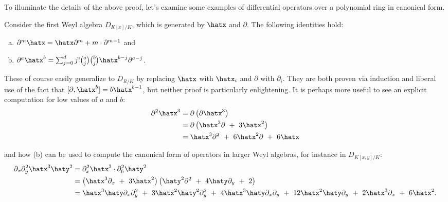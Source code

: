 To illuminate the details of the above proof, let's examine some examples of differential operators over a polynomial ring in canonical form.
\begin{example}\label{example:diff-op-canonical-form}
	Consider the first Weyl algebra $D_{K[x]/K}$, which is generated by $\hatx$ and $\partial$. The following identities hold:
	\begin{enumerate}[(a)]
		\item $\partial^m \hatx = \hatx\partial^m + m\cdot\partial^{m-1}$ and 
		\item $\partial^a\hatx^b = \sum^d_{j=0} j!\binom{a}{j}\binom{b}{j} \hatx^{b-j}\partial^{a-j}$.
	\end{enumerate}
	These of course easily generalize to $D_{R/K}$ by replacing $\hatx$ with $\hatx_i$ and $\partial$ with $\partial_i$. They are both proven via induction and liberal use of the fact that $[\partial,\hatx^b] = b\hatx^{b-1}$, but neither proof is particularly enlightening. It is perhaps more useful to see an explicit computation for low values of $a$ and $b$:
    \begin{align*}
    	\partial^2\hatx^3 
		&= \partial\left(\partial \hatx^3\right) \\
		&= \partial\left(\hatx^3\partial ~+~ 3\hatx^2\right) \\
		&= \hatx^3\partial^2 ~+~ 6\hatx^2\partial ~+~ 6\hatx
    \end{align*}

	\begin{comment}
		It is perhaps more useful to see how $\hatx$ migrates across the $\partial$ terms in (a),
		\begin{align*}
			\partial^m\hatx
			&= \partial^{m-1}(\hatx\partial+1) ~=~ \partial^{m-1}\hatx\partial+\partial^{m-1}\\
			&= \partial^{m-2}(\hatx\partial+1)\partial + \partial^{m-1}~=~  \partial^{m-2}\hatx\partial^2+2\partial^{m-1} \\
			&\hspace{0.5em}\vdots \\
			&= \partial \hatx\partial^{m-1}+ (m-1)\partial^{m-1} ~=~ (\hatx\partial + 1)\partial^{m-1} + (m-1)\partial^{m-1}\\
			&= \hatx\partial^m + m\partial^{m-1},
		\end{align*}
	\end{comment}

	\noindent and how (b) can be used to compute the canonical form of operators in larger Weyl algebras, for instance in $D_{K[x,y]/K}$:
	\begin{align*}
		\partial_x\partial^2_y\hatx^3\haty^2
		&= \partial^2_x\hatx^3\cdot  \partial_6^2\haty^2 \\
		&= \left(\hatx^3\partial_x ~+~ 3\hatx^2\right)\left(\haty^2\partial^2 ~+~ 4\haty\partial_y ~+~ 2\right) \\
		&= \hatx^3\haty\partial_x\partial_y^2 ~+~ 3\hatx^2\haty^2\partial^2_y ~+~ 4\hatx^3\haty\partial_x\partial_y ~+~ 12\hatx^2\haty\partial_y ~+~ 2\hatx^3\partial_x ~+~ 6\hatx^2.
	\end{align*}
\end{example}
